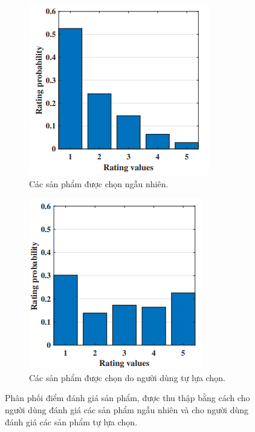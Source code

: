 \begin{figure}
    \centering
    \begin{subfigure}[b]{0.4\textwidth}
     \centering
     \includegraphics[width=\textwidth]{images/Chapter1/bias_1.png}
     \caption{Các sản phẩm được chọn ngẫu nhiên.}
     \label{fig:randomly_selected}
    \end{subfigure}
    \hfill
    \begin{subfigure}[b]{0.4\textwidth}
     \centering
     \includegraphics[width=\textwidth]{images/Chapter1/bias_2.png}
     \caption{Các sản phẩm được chọn do người dùng tự lựa chọn.}
     \label{fig:user_selected}
    \end{subfigure}
    \caption{Phân phối điểm đánh giá sản phẩm, được thu thập bằng cách cho người dùng đánh giá các sản phẩm ngẫu nhiên và cho người dùng đánh giá các sản phẩm tự lựa chọn.}
    \label{fig:self_selection_bias}
\end{figure}

